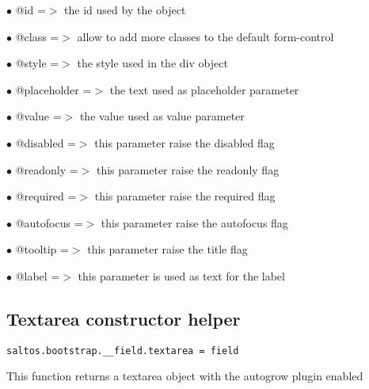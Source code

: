\documentclass[a4paper]{book}
\begin{document}
\begin{compactitem}
\item[\color{myblue}$\bullet$] @id          =$>$ the id used by the object
\item[\color{myblue}$\bullet$] @class       =$>$ allow to add more classes to the default form-control
\item[\color{myblue}$\bullet$] @style       =$>$ the style used in the div object
\item[\color{myblue}$\bullet$] @placeholder =$>$ the text used as placeholder parameter
\item[\color{myblue}$\bullet$] @value       =$>$ the value used as value parameter
\item[\color{myblue}$\bullet$] @disabled    =$>$ this parameter raise the disabled flag
\item[\color{myblue}$\bullet$] @readonly    =$>$ this parameter raise the readonly flag
\item[\color{myblue}$\bullet$] @required    =$>$ this parameter raise the required flag
\item[\color{myblue}$\bullet$] @autofocus   =$>$ this parameter raise the autofocus flag
\item[\color{myblue}$\bullet$] @tooltip     =$>$ this parameter raise the title flag
\item[\color{myblue}$\bullet$] @label       =$>$ this parameter is used as text for the label
\end{compactitem}

\hypertarget{toc443}{}
\subsection{Textarea constructor helper}

\begin{lstlisting}
saltos.bootstrap.__field.textarea = field
\end{lstlisting}

This function returns a textarea object with the autogrow plugin enabled
\end{document}
